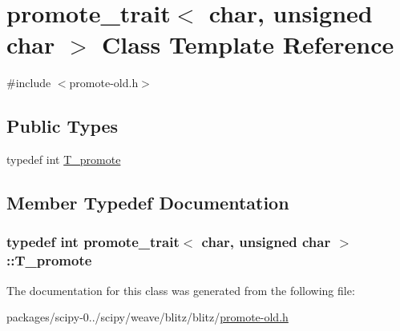 \hypertarget{classpromote__trait_3_01char_00_01unsigned_01char_01_4}{}\section{promote\+\_\+trait$<$ char, unsigned char $>$ Class Template Reference}
\label{classpromote__trait_3_01char_00_01unsigned_01char_01_4}


{\ttfamily \#include $<$promote-\/old.\+h$>$}

\subsection*{Public Types}
\begin{DoxyCompactItemize}
\item 
typedef int \hyperlink{classpromote__trait_3_01char_00_01unsigned_01char_01_4_afc209c4b4bc0d805f2495bc5b9249383}{T\+\_\+promote}
\end{DoxyCompactItemize}


\subsection{Member Typedef Documentation}
\hypertarget{classpromote__trait_3_01char_00_01unsigned_01char_01_4_afc209c4b4bc0d805f2495bc5b9249383}{}
\subsubsection[{T\+\_\+promote}]{\setlength{\rightskip}{0pt plus 5cm}typedef int {\bf promote\+\_\+trait}$<$ char, unsigned char $>$\+::{\bf T\+\_\+promote}}\label{classpromote__trait_3_01char_00_01unsigned_01char_01_4_afc209c4b4bc0d805f2495bc5b9249383}


The documentation for this class was generated from the following file\+:\begin{DoxyCompactItemize}
\item 
packages/scipy-\/0../scipy/weave/blitz/blitz/\hyperlink{promote-old_8h}{promote-\/old.\+h}\end{DoxyCompactItemize}
